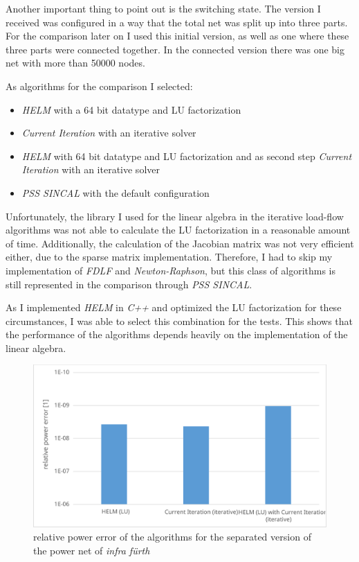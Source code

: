 Another important thing to point out is the switching state. The version I received was configured in a way that the total net was split up into three parts. For the comparison later on I used this initial version, as well as one where these three parts were connected together. In the connected version there was one big net with more than 50000 nodes.

As algorithms for the comparison I selected:
\begin{itemize}
	\item \emph{HELM} with a 64 bit datatype and LU factorization
	\item \emph{Current Iteration} with an iterative solver
	\item \emph{HELM} with 64 bit datatype and LU factorization and as second step \emph{Current Iteration} with an iterative solver
	\item \emph{PSS SINCAL} with the default configuration
\end{itemize}
Unfortunately, the library I used for the linear algebra in the iterative load-flow algorithms was not able to calculate the LU factorization in a reasonable amount of time. Additionally, the calculation of the Jacobian matrix was not very efficient either, due to the sparse matrix implementation. Therefore, I had to skip my implementation of \emph{FDLF} and \emph{Newton-Raphson}, but this class of algorithms is still represented in the comparison through \emph{PSS SINCAL}.

As I implemented \emph{HELM} in \emph{C++} and optimized the LU factorization for these circumstances, I was able to select this combination for the tests. This shows that the performance of the algorithms depends heavily on the implementation of the linear algebra.

\begin{figure}
	\centering
	\includegraphics[scale=0.7]{figures/big_net_separate_relative_power_error}
	\caption[Comparison, \emph{infra fürth}, separate, error]{relative power error of the algorithms for the separated version of the power net of \emph{infra fürth}}
	\label{fig:big_net_separate_relative_power_error}
\end{figure}

